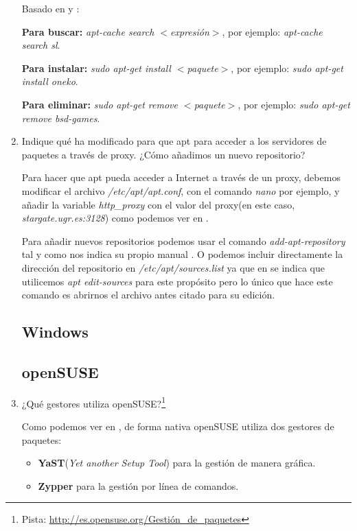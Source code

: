 \documentclass[paper=a4, fontsize=11pt]{scrartcl} %
\numberwithin{equation}{section} %
\numberwithin{figure}{section} %
\numberwithin{table}{section} %
\begin{document}
\begin{enumerate}
		Basado en \cite{man_apt-cache} y \cite{man_apt-get}:
		
		\textbf{Para buscar:} \textit{apt-cache search $<$expresión$>$}, por ejemplo: \textit{apt-cache
		search sl}.
		
		\textbf{Para instalar:} \textit{sudo apt-get install $<$paquete$>$}, por ejemplo: \textit{sudo
		apt-get install oneko}.
		
		\textbf{Para eliminar:} \textit{sudo apt-get remove $<$paquete$>$}, por ejemplo: \textit{sudo
		apt-get remove bsd-games}.
		
		\item Indique qué ha modificado para que apt para acceder a los servidores de paquetes a través
		de proxy. ¿Cómo añadimos un nuevo repositorio?
		
		Para hacer que apt pueda acceder a Internet a través de un proxy, debemos modificar el archivo
		\textit{/etc/apt/apt.conf}, con el comando \textit{nano} por ejemplo, y añadir la variable
		\textit{http\_proxy} con el valor del proxy(en este caso, \textit{stargate.ugr.es:3128}) como
		podemos ver en \cite{man_apt.conf}.
		
		Para añadir nuevos repositorios podemos usar el comando \textit{add-apt-repository} tal y como
		nos indica su propio manual \cite{man_add-apt-repository}. O podemos incluir directamente la
		dirección del repositorio en \textit{/etc/apt/sources.list} ya que en \cite{man_apt} se indica
		que utilicemos \textit{apt edit-sources} para este propósito pero lo único que hace este comando
		es abrirnos el archivo antes citado para su edición.
	
	\subsection{Windows}
	\subsection{openSUSE}
		\item ¿Qué gestores utiliza openSUSE?\footnote{Pista: \url{http://es.opensuse.org/Gestión_de_paquetes}}
		
		Como podemos ver en \cite{oS_packman}, de forma nativa openSUSE utiliza dos gestores de paquetes:
		
		\begin{itemize}
			\item \textbf{YaST}\cite{oS_YaST}(\textit{Yet another Setup Tool}) para la gestión de manera
			gráfica.
			\item \textbf{Zypper}\cite{oS_zypper} para la gestión por línea de comandos.
		\end{itemize}
		

\end{enumerate}
\end{document}
